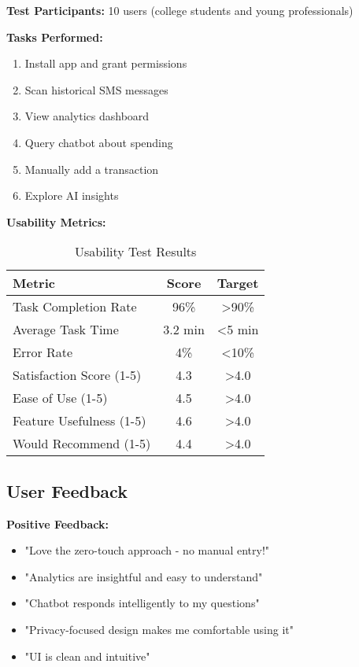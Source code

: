 \documentclass[11pt,a4paper]{report}
\begin{document}
\begin{itemize}
\begin{itemize}
\textbf{Test Participants:} 10 users (college students and young professionals)

\textbf{Tasks Performed:}
\begin{enumerate}
    \item Install app and grant permissions
    \item Scan historical SMS messages
    \item View analytics dashboard
    \item Query chatbot about spending
    \item Manually add a transaction
    \item Explore AI insights
\end{enumerate}

\textbf{Usability Metrics:}
\begin{table}[H]
\centering
\caption{Usability Test Results}
\begin{tabular}{|l|c|c|}
\hline
\textbf{Metric} & \textbf{Score} & \textbf{Target} \\
\hline
Task Completion Rate & 96\% & >90\% \\
Average Task Time & 3.2 min & <5 min \\
Error Rate & 4\% & <10\% \\
Satisfaction Score (1-5) & 4.3 & >4.0 \\
Ease of Use (1-5) & 4.5 & >4.0 \\
Feature Usefulness (1-5) & 4.6 & >4.0 \\
Would Recommend (1-5) & 4.4 & >4.0 \\
\hline
\end{tabular}
\end{table}

\subsection{User Feedback}

\textbf{Positive Feedback:}
\begin{itemize}
    \item "Love the zero-touch approach - no manual entry!"
    \item "Analytics are insightful and easy to understand"
    \item "Chatbot responds intelligently to my questions"
    \item "Privacy-focused design makes me comfortable using it"
    \item "UI is clean and intuitive"
\end{itemize}


\end{itemize}
\end{itemize}
\end{document}
